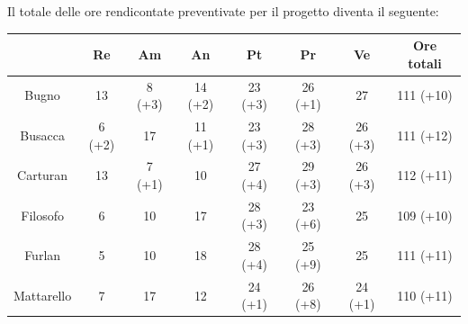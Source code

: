 
\pagebreak
Il totale delle ore rendicontate preventivate per il progetto diventa il seguente:

\begin{table}[H]
  \centering
  \renewcommand{\arraystretch}{1.8}
  \begin{tabular}{c|c|c|c|c|c|c|c}
    \rowcolor[HTML]{125E28}
    \multicolumn{1}{c}{\color[HTML]{FFFFFF}\textbf{ Nominativo }}
                        & \multicolumn{1}{c}{\color[HTML]{FFFFFF}\textbf{ Re }}
                        & \multicolumn{1}{c}{\color[HTML]{FFFFFF}\textbf{ Am}}
                        & \multicolumn{1}{c}{\color[HTML]{FFFFFF}\textbf{ An }}
                        & \multicolumn{1}{c}{\color[HTML]{FFFFFF}\textbf{ Pt }}
                        & \multicolumn{1}{c}{\color[HTML]{FFFFFF}\textbf{ Pr }}
                        & \multicolumn{1}{c}{\color[HTML]{FFFFFF}\textbf{ Ve }}
                        & \multicolumn{1}{c}{\color[HTML]{FFFFFF}\textbf{ Ore totali }}                                                                                                                            \\
    \hline
    Bugno               & 13                                                            & 8 (+3)           & 14 (+2)           & 23 (+3)            & 26 (+1)            & 27                 & 111 (+10)          \\
    Busacca             & 6 (+2)                                                        & 17               & 11 (+1)           & 23 (+3)            & 28 (+3)            & 26 (+3)            & 111 (+12)          \\
    Carturan            & 13                                                            & 7 (+1)           & 10                & 27 (+4)            & 29 (+3)            & 26 (+3)            & 112 (+11)          \\
    Filosofo            & 6                                                             & 10               & 17                & 28 (+3)            & 23 (+6)            & 25                 & 109 (+10)          \\
    Furlan              & 5                                                             & 10               & 18                & 28 (+4)            & 25 (+9)            & 25                 & 111 (+11)          \\
    Mattarello          & 7                                                             & 17               & 12                & 24 (+1)            & 26 (+8)            & 24 (+1)            & 110 (+11)          \\

\end{tabular}
\end{table}
